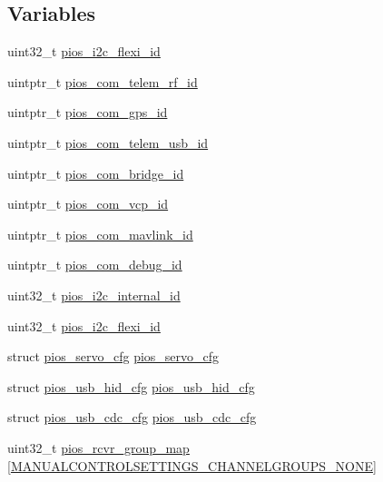 \subsection*{\-Variables}
\begin{DoxyCompactItemize}
\item 
uint32\-\_\-t \hyperlink{group___sparky_ga496fb59667d43b64732790b9de5b3ddb}{pios\-\_\-i2c\-\_\-flexi\-\_\-id}
\item 
uintptr\-\_\-t \hyperlink{group___sparky_gae48e848f715b08971e23528feee79339}{pios\-\_\-com\-\_\-telem\-\_\-rf\-\_\-id}
\item 
uintptr\-\_\-t \hyperlink{group___sparky_ga05dca72c42c6c2b33fa62b8ee0fcb2ea}{pios\-\_\-com\-\_\-gps\-\_\-id}
\item 
uintptr\-\_\-t \hyperlink{group___sparky_ga513cc36d72b76de2fcb75ff233a79a4a}{pios\-\_\-com\-\_\-telem\-\_\-usb\-\_\-id}
\item 
uintptr\-\_\-t \hyperlink{group___sparky_gac040f05fa048688ee0269c2768698a14}{pios\-\_\-com\-\_\-bridge\-\_\-id}
\item 
uintptr\-\_\-t \hyperlink{group___sparky_gaaeb3e0d65ed5c6e7b921c54e1ad905db}{pios\-\_\-com\-\_\-vcp\-\_\-id}
\item 
uintptr\-\_\-t \hyperlink{group___sparky_gabdefeb92517c08b2db19b764db941de9}{pios\-\_\-com\-\_\-mavlink\-\_\-id}
\item 
uintptr\-\_\-t \hyperlink{group___sparky_ga14dc9e3d330b80a37a9699c2112358e0}{pios\-\_\-com\-\_\-debug\-\_\-id}
\item 
uint32\-\_\-t \hyperlink{group___sparky_gad2c74451613ce4fb69f79e9941dde55e}{pios\-\_\-i2c\-\_\-internal\-\_\-id}
\item 
uint32\-\_\-t \hyperlink{group___sparky_ga496fb59667d43b64732790b9de5b3ddb}{pios\-\_\-i2c\-\_\-flexi\-\_\-id}
\item 
struct \hyperlink{structpios__servo__cfg}{pios\-\_\-servo\-\_\-cfg} \hyperlink{group___sparky_ga57a87ef16d7949a9cc3589efc8d88a28}{pios\-\_\-servo\-\_\-cfg}
\item 
struct \hyperlink{structpios__usb__hid__cfg}{pios\-\_\-usb\-\_\-hid\-\_\-cfg} \hyperlink{group___sparky_ga3665f6d3a2cccc431b55b9432291e94c}{pios\-\_\-usb\-\_\-hid\-\_\-cfg}
\item 
struct \hyperlink{structpios__usb__cdc__cfg}{pios\-\_\-usb\-\_\-cdc\-\_\-cfg} \hyperlink{group___sparky_ga05cc3e449d417c7f9097d2659e6f5ca3}{pios\-\_\-usb\-\_\-cdc\-\_\-cfg}
\item 
uint32\-\_\-t \hyperlink{group___sparky_ga6c6cfc16eb738e47c123298e062297e2}{pios\-\_\-rcvr\-\_\-group\-\_\-map} \mbox{[}\hyperlink{group___manual_control_settings_gga94e1fe696fef2f85cbdb4a2e479c7ed2af9104b4e2c50328b0912db1e10fc3074}{\-M\-A\-N\-U\-A\-L\-C\-O\-N\-T\-R\-O\-L\-S\-E\-T\-T\-I\-N\-G\-S\-\_\-\-C\-H\-A\-N\-N\-E\-L\-G\-R\-O\-U\-P\-S\-\_\-\-N\-O\-N\-E}\mbox{]}

\end{DoxyCompactItemize}
